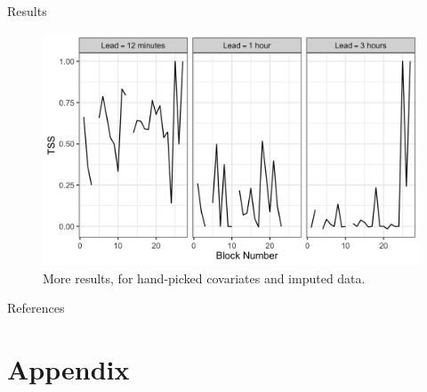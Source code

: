 \documentclass{beamer}
\begin{document}
\begin{frame}{Results}
    \begin{figure}[!htb]
        \centering
        \includegraphics[scale=0.25]{0901_results.png}
        \caption{More results, for hand-picked covariates and imputed data.}
        \label{fig:0901_results}
    \end{figure}
\end{frame}



\begin{frame}[allowframebreaks]{References}
    \nocite{*}
    \printbibliography
\end{frame}

\section{Appendix}
\end{document}
